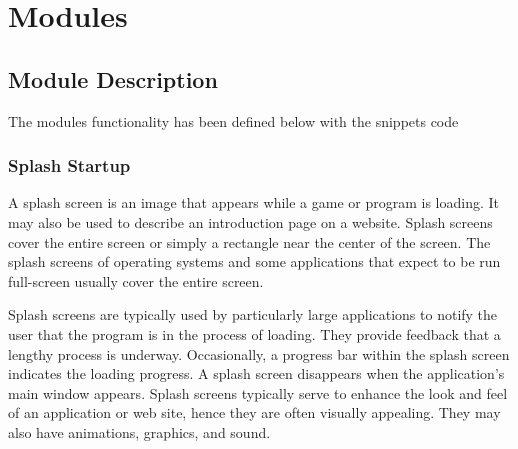 	\makeatletter
	\def\@makechapterhead#1{%
	  \vspace*{50\p@}%
	  {\parindent \z@ \centering\normalfont
	    \ifnum \c@secnumdepth >\m@ne
	      \if@mainmatter
	         \Large\bfseries \@chapapp\space \thechapter
 	        \par\nobreak
	        \vskip 20\p@
	      \fi
	    \fi
	    \interlinepenalty\@M
	     \Large \bfseries #1\par\nobreak
	
	    \vskip 40\p@
	  }}
	\def\@makeschapterhead#1{%
	  \vspace*{50\p@}%
	  {\parindent \z@ \centering 
	    \normalfont
	    \interlinepenalty\@M
	    \Large\bfseries  #1\par\nobreak
	    \vskip 40\p@
	  }}
	\makeatother
	\titlespacing*{\chapter}{0pt}{0pt}{12pt}

\chapter{Modules}


\section{Module Description}
The modules functionality has been defined below with the snippets code

\subsection{Splash Startup}

A splash screen is an image that appears while a game or program is loading. It may also be used to describe an introduction page on a website. Splash screens cover the entire screen or simply a rectangle near the center of the screen. The splash screens of operating systems and some applications that expect to be run full-screen usually cover the entire screen.

Splash screens are typically used by particularly large applications to notify the user that the program is in the process of loading. They provide feedback that a lengthy process is underway. Occasionally, a progress bar within the splash screen indicates the loading progress. A splash screen disappears when the application's main window appears.
Splash screens typically serve to enhance the look and feel of an application or web site, hence they are often visually appealing. They may also have animations, graphics, and sound.

